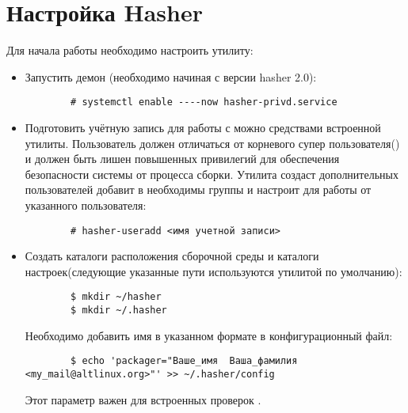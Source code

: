 \hypertarget{5.1}{\section{Настройка Hasher}}
Для начала работы необходимо настроить утилиту:
\begin{itemize}
	\item Запустить демон (необходимо начиная с версии hasher 2.0):
	\begin{verbatim}
		# systemctl enable ----now hasher-privd.service
	\end{verbatim}
	
	\item Подготовить учётную запись для работы с  можно средствами встроенной утилиты.
	Пользователь должен отличаться от корневого супер пользователя() и должен быть
	лишен повышенных привилегий для обеспечения безопасности системы от процесса сборки.
	Утилита создаст дополнительных пользователей добавит в необходимы группы и настроит
	 для работы от указанного пользователя:
	\begin{verbatim}
		# hasher-useradd <имя учетной записи>
	\end{verbatim}
	
	\item Создать каталоги расположения сборочной среды и каталоги настроек(следующие указанные
	пути используются утилитой  по умолчанию):
	\begin{verbatim}
		$ mkdir ~/hasher
		$ mkdir ~/.hasher
	\end{verbatim}
	
	Необходимо добавить имя в указанном формате в конфигурационный файл:
	\begin{verbatim}
		$ echo 'packager="Ваше_имя  Ваша_фамилия <my_mail@altlinux.org>"' >> ~/.hasher/config
	\end{verbatim}
	Этот параметр важен для встроенных проверок .
	

\end{itemize}
